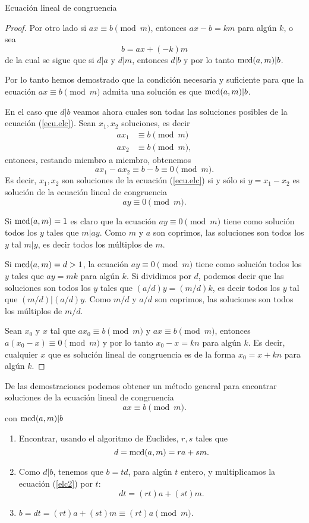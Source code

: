 \begin{section}{Ecuación lineal de congruencia}
\begin{proof}
Por otro lado si $ax\equiv b\pmod{m}$, entonces $ax-b=km$ para
algún $k$, o sea
$$
b=ax+(-k)m
$$
de la cual se sigue que si $d|a$ y $d|m$, entonces $d|b$ y por lo
tanto $\operatorname{mcd}(a,m)|b$.

Por lo tanto hemos demostrado que la condición necesaria y
suficiente para que la ecuación $ax\equiv b \pmod{m}$ admita una
solución es que $\operatorname{mcd}(a,m)|b$.

En el caso que $d|b$ veamos ahora cuales son todas las soluciones posibles de la ecuación (\ref{ecu.elc}). Sean $x_1,x_2$ soluciones, es decir
\begin{align*}
ax_1 &\equiv b \pmod{m} \\
ax_2 &\equiv b \pmod{m},
\end{align*}
entonces, restando miembro a miembro, obtenemos
$$
ax_1 -ax_2 \equiv b - b \equiv 0 \pmod{m}.
$$
Es decir, $x_1,x_2$ son soluciones de la ecuación (\ref{ecu.elc}) si y sólo si  $y = x_1 -x_2$ es solución de la ecuación lineal de congruencia
\begin{equation*}
ay \equiv 0 \pmod{m}.
\end{equation*}

Si $\operatorname{mcd}(a,m) =1$ es claro que la ecuación $ay \equiv 0 \pmod{m}$ tiene como solución todos los $y$ tales que $m|ay$. Como $m$ y $a$ son  coprimos, las soluciones son todos los $y$ tal $m|y$, es decir todos los múltiplos de $m$.

Si $\operatorname{mcd}(a,m) =d > 1$,  la ecuación $ay \equiv 0 \pmod{m}$ tiene como solución todos los $y$ tales que $ay=mk$ para algún $k$. Si dividimos por $d$, podemos decir que las soluciones son todos los $y$ tales que $(a/d)y = (m/d)k$, es decir todos los $y$ tal que $(m/d)|(a/d)y$. Como $m/d$ y $a/d$ son coprimos, las soluciones son todos los múltiplos de $m/d$.

Sean $x_0$ y $x$ tal que $ax_0 \equiv b \pmod{m}$ y $ax \equiv b \pmod{m}$, entonces $a(x_0-x) \equiv 0 \pmod{m}$ y por lo tanto $x_0-x = kn$ para algún $k$. Es decir, cualquier $x$ que es solución lineal de congruencia es de la forma $x_0 = x+kn$ para algún $k$.
\end{proof}

De las demostraciones podemos obtener un método general para encontrar soluciones de la ecuación lineal de congruencia
$$
ax \equiv b \pmod{m}.
$$
con $\operatorname{mcd}(a,m)|b$


\begin{enumerate}[label=\textit{\alph*)}]
\item\label{elc-a}  Encontrar, usando el algoritmo de Euclides, $r,s$ tales que 
\begin{equation}\label{elc2}
d =\operatorname{mcd}(a,m) = ra+sm.
\end{equation}
\item\label{elc-b}  Como $d|b$, tenemos que $b = td$, para algún $t$ entero, y multiplicamos la ecuación (\ref{elc2}) por $t$: $$dt =  (rt)a+(st)m.$$
\item\label{elc-c}  $b = dt = (rt)a+(st)m \equiv (rt)a \pmod{m}$. 


\end{enumerate}
\end{section}
